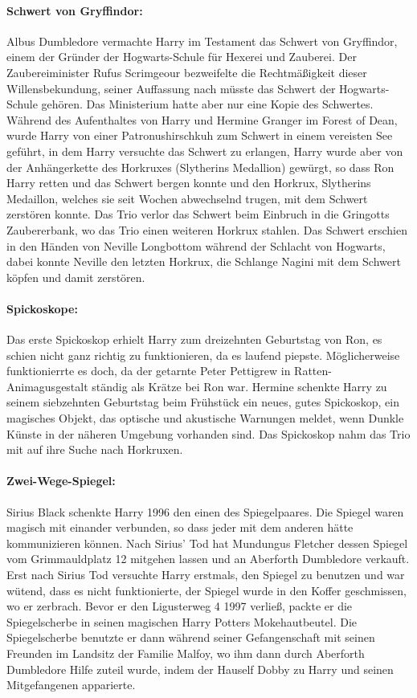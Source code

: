 \documentclass[a4paper, 10pt]{article}
\begin{document}
\paragraph{Schwert von Gryffindor:}
Albus Dumbledore vermachte Harry im Testament das Schwert von Gryffindor, einem der Gründer der Hogwarts-Schule für Hexerei und Zauberei. Der Zaubereiminister Rufus Scrimgeour bezweifelte die Rechtmäßigkeit dieser Willensbekundung, seiner Auffassung nach müsste das Schwert der Hogwarts-Schule gehören. Das Ministerium hatte aber nur eine Kopie des Schwertes. Während des Aufenthaltes von Harry und Hermine Granger im Forest of Dean, wurde Harry von einer Patronushirschkuh zum Schwert in einem vereisten See geführt, in dem Harry versuchte das Schwert zu erlangen, Harry wurde aber von der Anhängerkette des Horkruxes (Slytherins Medallion) gewürgt, so dass Ron Harry retten und das Schwert bergen konnte und den Horkrux, Slytherins Medaillon, welches sie seit Wochen abwechselnd trugen, mit dem Schwert zerstören konnte. Das Trio verlor das Schwert beim Einbruch in die Gringotts Zaubererbank, wo das Trio einen weiteren Horkrux stahlen. Das Schwert erschien in den Händen von Neville Longbottom während der Schlacht von Hogwarts, dabei konnte Neville den letzten Horkrux, die Schlange Nagini mit dem Schwert köpfen und damit zerstören.
\paragraph{Spickoskope:}
Das erste Spickoskop erhielt Harry zum dreizehnten Geburtstag von Ron, es schien nicht ganz richtig zu funktionieren, da es laufend piepste. Möglicherweise funktionierrte es doch, da der getarnte Peter Pettigrew in Ratten-Animagusgestalt ständig als Krätze bei Ron war. Hermine schenkte Harry zu seinem siebzehnten Geburtstag beim Frühstück ein neues, gutes Spickoskop, ein magisches Objekt, das optische und akustische Warnungen meldet, wenn Dunkle Künste in der näheren Umgebung vorhanden sind. Das Spickoskop nahm das Trio mit auf ihre Suche nach Horkruxen.

\paragraph{Zwei-Wege-Spiegel:}
Sirius Black schenkte Harry 1996 den einen des Spiegelpaares. Die Spiegel waren magisch mit einander verbunden, so dass jeder mit dem anderen hätte kommunizieren können. Nach Sirius' Tod hat Mundungus Fletcher dessen Spiegel vom Grimmauldplatz 12 mitgehen lassen und an Aberforth Dumbledore verkauft. Erst nach Sirius Tod versuchte Harry erstmals, den Spiegel zu benutzen und war wütend, dass es nicht funktionierte, der Spiegel wurde in den Koffer geschmissen,
wo er zerbrach. Bevor er den Ligusterweg 4 1997 verließ, packte er die Spiegelscherbe in seinen magischen Harry Potters Mokehautbeutel. Die Spiegelscherbe benutzte er dann während seiner Gefangenschaft mit seinen Freunden im Landsitz der Familie Malfoy, wo ihm dann durch Aberforth Dumbledore Hilfe zuteil wurde, indem der Hauself Dobby zu Harry und seinen Mitgefangenen apparierte.
\end{document}
